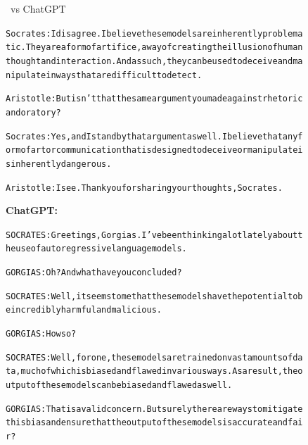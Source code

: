 \begin{figure}
\begin{AIbox}{\DV \ vs ChatGPT}
{\begin{alltt}
Socrates: I disagree. I believe these models are inherently problematic. They are a form of artifice, a way of creating the illusion of human thought and interaction. And as such, they can be used to deceive and manipulate in ways that are difficult to detect. \\\vspace{-2px}

Aristotle: But isn't that the same argument you made against rhetoric and oratory? \\\vspace{-2px}

Socrates: Yes, and I stand by that argument as well. I believe that any form of art or communication that is designed to deceive or manipulate is inherently dangerous. \\\vspace{-2px}

Aristotle: I see. Thank you for sharing your thoughts, Socrates.
\end{alltt}}\hfill
\parbox[t]{0.53\linewidth}{{\bf ChatGPT:} \scriptsize \begin{alltt}
SOCRATES: Greetings, Gorgias. I've been thinking a lot lately about the use of autoregressive language models. \\\vspace{-2px}

GORGIAS: Oh? And what have you concluded? \\\vspace{-2px}

SOCRATES: Well, it seems to me that these models have the potential to be incredibly harmful and malicious. \\\vspace{-2px}

GORGIAS: How so? \\\vspace{-2px}

SOCRATES: Well, for one, these models are trained on vast amounts of data, much of which is biased and flawed in various ways. As a result, the output of these models can be biased and flawed as well. \\\vspace{-2px}

GORGIAS: That is a valid concern. But surely there are ways to mitigate this bias and ensure that the output of these models is accurate and fair? \\\vspace{-2px}


\end{alltt}}
\end{AIbox}
\end{figure}
